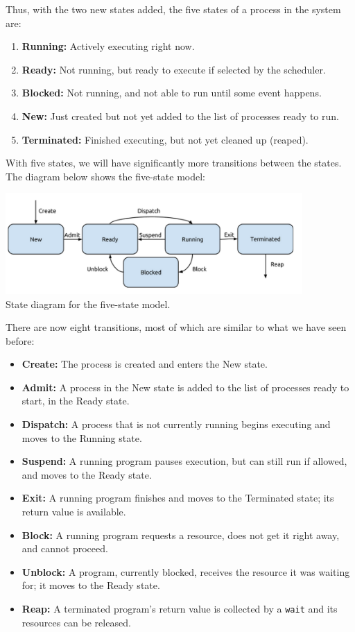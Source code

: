 Thus, with the two new states added, the five states of a process in the system are:

\begin{enumerate}
	\item \textbf{Running:} Actively executing right now.
	\item \textbf{Ready:} Not running, but ready to execute if selected by the scheduler.
	\item \textbf{Blocked:} Not running, and not able to run until some event happens.
	\item \textbf{New:} Just created but not yet added to the list of processes ready to run.
	\item \textbf{Terminated:} Finished executing, but not yet cleaned up (reaped).
\end{enumerate}

With five states, we will have significantly more transitions between the states. The diagram below shows the five-state model:

\begin{center}
	\includegraphics[width=0.85\textwidth]{images/5-state-model.png}\\
	State diagram for the five-state model.
\end{center}

There are now eight transitions, most of which are similar to what we have seen before:

\begin{itemize}
	\item \textbf{Create:} The process is created and enters the New state.
	\item \textbf{Admit:} A process in the New state is added to the list of processes ready to start, in the Ready state.
	\item \textbf{Dispatch:} A process that is not currently running begins executing and moves to the Running state.
	\item \textbf{Suspend:} A running program pauses execution, but can still run if allowed, and moves to the Ready state.
	\item \textbf{Exit:} A running program finishes and moves to the Terminated state; its return value is available.
	\item \textbf{Block:} A running program requests a resource, does not get it right away, and cannot proceed.
	\item \textbf{Unblock:} A program, currently blocked, receives the resource it was waiting for; it moves to the Ready state.
	\item \textbf{Reap:} A terminated program's return value is collected by a \texttt{wait} and its resources can be released.
\end{itemize}

